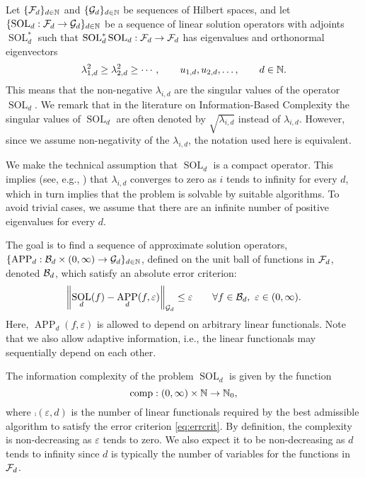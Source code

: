 \documentclass[sort&compress]{elsarticle}
\DeclareMathOperator{\SOL}{SOL}
\DeclareMathOperator{\APP}{APP}
\newcommand{\peter}[1]{\begingroup\color{violet}#1\endgroup}
\begin{document}
Let $\{\mathcal{F}_d\}_{d \in \mathbb{N}}$ and $\{\mathcal{G}_d\}_{d \in \mathbb{N}}$ be sequences of Hilbert spaces, and let $\{\SOL_d : \cf_d \to \cg_d\}_{d \in \naturals}$ be a sequence of linear solution operators  with adjoints $\SOL_d^*$ such that $\SOL_d^*\SOL_d : \cf_d \to \cf_d$ has eigenvalues and orthonormal eigenvectors
\begin{equation} \label{eq:eigenvalues}
 \lambda_{1,d}^2 \ge \lambda_{2,d}^2 \ge \cdots, \qquad u_{1,d}, u_{2,d}, \ldots, \qquad d \in \mathbb{N}.
\end{equation}
This means that the non-negative $\lambda_{i,d}$ are the singular values of the operator $\SOL_d$. We remark that in the literature on Information-Based Complexity the singular values of $\SOL_d$ are often denoted by $\sqrt{\lambda_{i,d}}$ instead of $\lambda_{i,d}$. However, since we assume non-negativity of the $\lambda_{i,d}$, the notation used here is equivalent.


We make the technical assumption that $\SOL_d$ is a compact operator. This implies (see, e.g., \cite{NovWoz08a}) that $\lambda_{i,d}$ converges to zero as $i$ tends to infinity for every $d$, which in turn implies that the problem is solvable by suitable algorithms. To avoid trivial cases, we assume that there are an infinite number of positive eigenvalues for every $d$.

The goal is to find a sequence of approximate solution operators, $\{\APP_d:\cb_d \times (0,\infty) \to \cg_d\}_{d \in \naturals}$, defined on the unit ball of functions in $\mathcal{F}_d$, denoted $\mathcal{B}_d$, which  satisfy an absolute error criterion:
\begin{equation}
    \label{eq:errcrit}
    \norm[\cg_d]{\SOL_d(f) - \APP_d(f,\varepsilon)} \le \varepsilon \qquad \forall f \in \cb_d, \ \varepsilon \in (0,\infty).
\end{equation}
Here, $\APP_d(f,\varepsilon)$ is allowed to depend on arbitrary linear functionals.  Note that we also allow adaptive information, i.e., the linear functionals may sequentially depend on each other.

The information complexity of the problem $\SOL_d$ is given by the function 
\[
\operatorname{comp}:(0,\infty) \times \mathbb{N} \to \mathbb{N}_{0}, 
\]
where $\comp(\varepsilon,d)$ is the number of linear functionals required by the best admissible algorithm to satisfy the error criterion \eqref{eq:errcrit}.
By definition, the complexity is non-decreasing  as $\varepsilon$ tends to zero.  We also expect it to be non-decreasing as $d$ tends to infinity since $d$ is typically the number of variables for the functions in $\mathcal{F}_d$.
\end{document}

